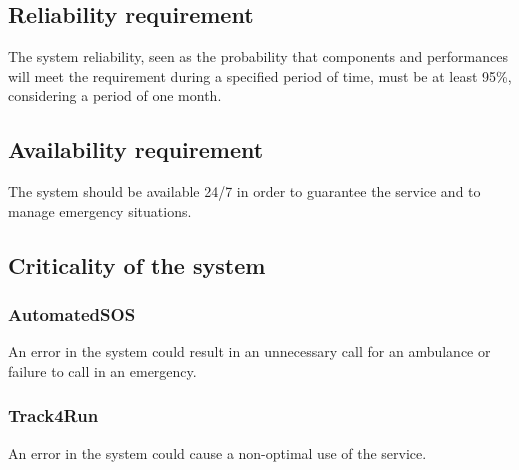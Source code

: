 \subsection{Reliability requirement}
The system reliability, seen as the probability that components and performances will meet the requirement during a specified period of time, must be at least 95\%, considering a period of one month.

\subsection{Availability requirement}
The system should be available 24/7 in order to guarantee the service and to manage emergency situations.

\subsection{Criticality of the system}
\subsubsection{AutomatedSOS}
An error in the system could result in an unnecessary call for an ambulance or failure to call in an emergency.
\subsubsection{Track4Run}
An error in the system could cause a non-optimal use of the service.

